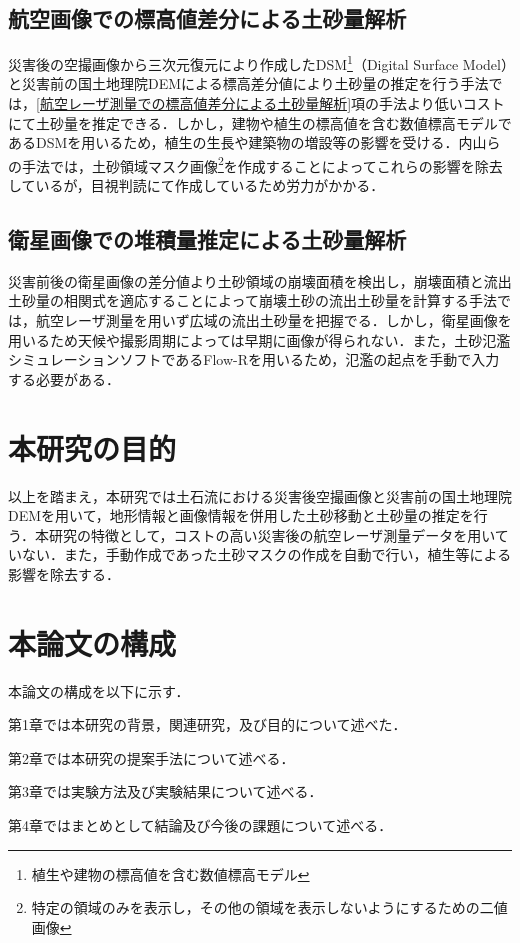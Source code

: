     \subsection{航空画像での標高値差分による土砂量解析}
      災害後の空撮画像から三次元復元により作成したDSM\footnote{植生や建物の標高値を含む数値標高モデル}（Digital Surface Model）と災害前の国土地理院DEM\cite{基盤地図情報}による標高差分値により土砂量の推定を行う手法\cite{土砂量解析3}では，\ref{航空レーザ測量での標高値差分による土砂量解析}項の手法より低いコストにて土砂量を推定できる．しかし，建物や植生の標高値を含む数値標高モデルであるDSMを用いるため，植生の生長や建築物の増設等の影響を受ける．内山らの手法\cite{土砂量解析4}では，土砂領域マスク画像\footnote{特定の領域のみを表示し，その他の領域を表示しないようにするための二値画像}を作成することによってこれらの影響を除去しているが，目視判読にて作成しているため労力がかかる．
    
    \subsection{衛星画像での堆積量推定による土砂量解析}
      災害前後の衛星画像の差分値より土砂領域の崩壊面積を検出し，崩壊面積と流出土砂量の相関式を適応することによって崩壊土砂の流出土砂量を計算する手法\cite{土砂量解析5}では，航空レーザ測量を用いず広域の流出土砂量を把握でる．しかし，衛星画像を用いるため天候や撮影周期によっては早期に画像が得られない．また，土砂氾濫シミュレーションソフトであるFlow-R\cite{Flow-R}を用いるため，氾濫の起点を手動で入力する必要がある．


  \section{本研究の目的}
    以上を踏まえ，本研究では土石流における災害後空撮画像と災害前の国土地理院
    DEMを用いて，地形情報と画像情報を併用した土砂移動と土砂量の推定を行う．本研究の特徴として，コストの高い災害後の航空レーザ測量データを用いていない．また，手動作成であった土砂マスクの作成を自動で行い，植生等による影響を除去する．


  \section{本論文の構成}
    本論文の構成を以下に示す．
    
    第1章では本研究の背景，関連研究，及び目的について述べた．

    第2章では本研究の提案手法について述べる．

    第3章では実験方法及び実験結果について述べる．

    第4章ではまとめとして結論及び今後の課題について述べる．
